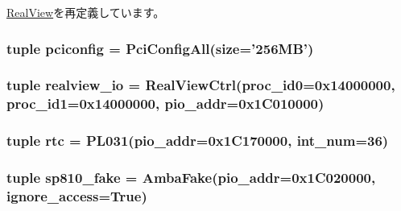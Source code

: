 \hyperlink{classRealView_1_1RealView_ae33825da8d9785badce3e6a89e61b1fe}{RealView}を再定義しています。\hypertarget{classRealView_1_1VExpress__EMM_af76b12e7e603a8ef5f908080bb3e6fab}{
\subsubsection[{pciconfig}]{\setlength{\rightskip}{0pt plus 5cm}tuple {\bf pciconfig} = {\bf PciConfigAll}(size='256MB')}}
\label{classRealView_1_1VExpress__EMM_af76b12e7e603a8ef5f908080bb3e6fab}
\hypertarget{classRealView_1_1VExpress__EMM_a54d7e0216558aeb12a980d61e36094da}{
\subsubsection[{realview\_\-io}]{\setlength{\rightskip}{0pt plus 5cm}tuple {\bf realview\_\-io} = {\bf RealViewCtrl}(proc\_\-id0=0x14000000, proc\_\-id1=0x14000000, pio\_\-addr=0x1C010000)}}
\label{classRealView_1_1VExpress__EMM_a54d7e0216558aeb12a980d61e36094da}
\hypertarget{classRealView_1_1VExpress__EMM_a8dc27866c57f35c90dbd18e3d7d154aa}{
\subsubsection[{rtc}]{\setlength{\rightskip}{0pt plus 5cm}tuple {\bf rtc} = {\bf PL031}(pio\_\-addr=0x1C170000, int\_\-num=36)}}
\label{classRealView_1_1VExpress__EMM_a8dc27866c57f35c90dbd18e3d7d154aa}
\hypertarget{classRealView_1_1VExpress__EMM_a42d6450a02aa42b77cd21f39eb6a3fbb}{
\subsubsection[{sp810\_\-fake}]{\setlength{\rightskip}{0pt plus 5cm}tuple {\bf sp810\_\-fake} = {\bf AmbaFake}(pio\_\-addr=0x1C020000, ignore\_\-access=True)}}
